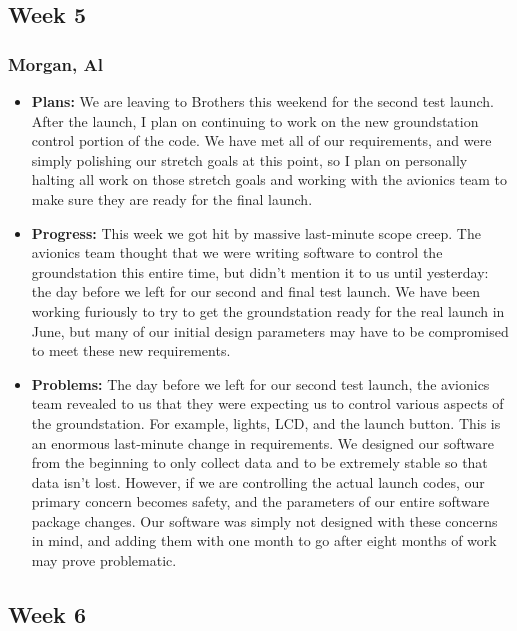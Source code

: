 \documentclass[10pt,draftclsnofoot,onecolumn]{IEEEtran}
\begin{document}
\subsection{Week 5}
\subsubsection{Morgan, Al}
\begin{itemize}
	\item \textbf{Plans: }
	We are leaving to Brothers this weekend for the second test launch. After the launch, I plan on continuing to work on the new groundstation control portion of the code. We have met all of our requirements, and were simply polishing our stretch goals at this point, so I plan on personally halting all work on those stretch goals and working with the avionics team to make sure they are ready for the final launch.
	\item \textbf{Progress: }
	This week we got hit by massive last-minute scope creep. The avionics team thought that we were writing software to control the groundstation this entire time, but didn't mention it to us until yesterday: the day before we left for our second and final test launch. We have been working furiously to try to get the groundstation ready for the real launch in June, but many of our initial design parameters may have to be compromised to meet these new requirements.
	\item \textbf{Problems: }
	The day before we left for our second test launch, the avionics team revealed to us that they were expecting us to control various aspects of the groundstation. For example, lights, LCD, and the launch button. This is an enormous last-minute change in requirements. We designed our software from the beginning to only collect data and to be extremely stable so that data isn't lost. However, if we are controlling the actual launch codes, our primary concern becomes safety, and the parameters of our entire software package changes. Our software was simply not designed with these concerns in mind, and adding them with one month to go after eight months of work may prove problematic.
\end{itemize}

\subsection{Week 6}
\end{document}
